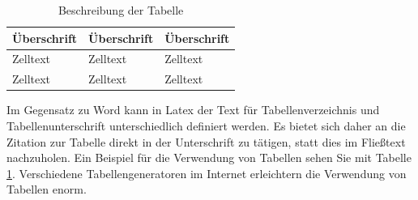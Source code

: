 \begin{table}[htbp]
\centering
\caption[Beschreibung der Tabelle]{Beschreibung der Tabelle \parencite[1-2]{bergener_wissenschaftliches_2019}}
\begin{tabular}{|p{}|p{}|p{}|}
\hline
\textbf{Überschrift} & \textbf{Überschrift} & \textbf{Überschrift} \\ \hline
Zelltext             & Zelltext             &   Zelltext             \\ \hline
Zelltext             & Zelltext             & Zelltext             \\ \hline
\end{tabular}
\label{tab:beispieltabelle}
\end{table}
Im Gegensatz zu Word kann in Latex der Text für Tabellenverzeichnis und Tabellenunterschrift unterschiedlich definiert werden. Es bietet sich daher an die Zitation zur Tabelle direkt in der Unterschrift zu tätigen, statt dies im Fließtext nachzuholen. Ein Beispiel für die Verwendung von Tabellen sehen Sie mit Tabelle \ref{tab:beispieltabelle}. Verschiedene Tabellengeneratoren im Internet erleichtern die Verwendung von Tabellen enorm.









